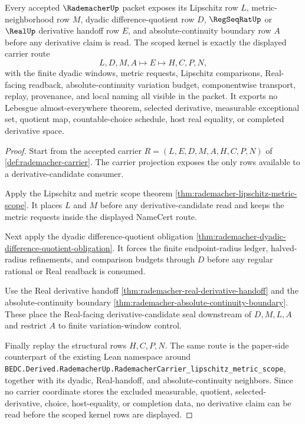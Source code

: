\begin{theorem}
\label{thm:rademacher-kernel-scope}
Every accepted $\RademacherUp$ packet exposes its Lipschitz row $L$, metric-neighborhood row $M$, dyadic difference-quotient row $D$, $\RegSeqRatUp$ or $\RealUp$ derivative handoff row $E$, and absolute-continuity boundary row $A$ before any derivative claim is read. The scoped kernel is exactly the displayed carrier route
$$
L,D,M,A \longmapsto E \longmapsto H,C,P,N,
$$
with the finite dyadic windows, metric requests, Lipschitz comparisons, Real-facing readback, absolute-continuity variation budget, componentwise transport, replay, provenance, and local naming all visible in the packet. It exports no Lebesgue almost-everywhere theorem, selected derivative, measurable exceptional set, quotient map, countable-choice schedule, host real equality, or completed derivative space.
\end{theorem}
\begin{proof}
Start from the accepted carrier $R=(L,E,D,M,A,H,C,P,N)$ of \autoref{def:rademacher-carrier}. The carrier projection exposes the only rows available to a derivative-candidate consumer.

Apply the Lipschitz and metric scope theorem \autoref{thm:rademacher-lipschitz-metric-scope}. It places $L$ and $M$ before any derivative-candidate read and keeps the metric requests inside the displayed NameCert route.

Next apply the dyadic difference-quotient obligation \autoref{thm:rademacher-dyadic-difference-quotient-obligation}. It forces the finite endpoint-radius ledger, halved-radius refinements, and comparison budgets through $D$ before any regular rational or Real readback is consumed.

Use the Real derivative handoff \autoref{thm:rademacher-real-derivative-handoff} and the absolute-continuity boundary \autoref{thm:rademacher-absolute-continuity-boundary}. These place the Real-facing derivative-candidate seal downstream of $D,M,L,A$ and restrict $A$ to finite variation-window control.

Finally replay the structural rows $H,C,P,N$. The same route is the paper-side counterpart of the existing Lean namespace around \texttt{BEDC.Derived.RademacherUp.RademacherCarrier\_lipschitz\_metric\_scope}, together with its dyadic, Real-handoff, and absolute-continuity neighbors. Since no carrier coordinate stores the excluded measurable, quotient, selected-derivative, choice, host-equality, or completion data, no derivative claim can be read before the scoped kernel rows are displayed.
\end{proof}


